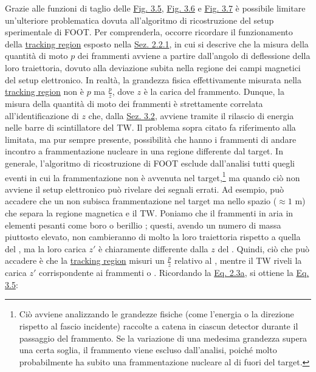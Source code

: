 \documentclass[12pt,a4paper,twoside]{report}
\begin{document}
	Grazie alle funzioni di taglio delle \hyperref[fig:a1_cut]{Fig. 3.5}, \hyperref[fig:a2_cut]{Fig. 3.6} e \hyperref[fig:a3_cut]{Fig. 3.7} è possibile limitare un'ulteriore problematica dovuta all'algoritmo di ricostruzione del setup sperimentale di FOOT. Per comprenderla, occorre ricordare il funzionamento della \hyperref[par:tracking_region]{tracking region} esposto nella \hyperref[sec:setupElettronico]{Sez. 2.2.1}, in cui si descrive che la misura della quantità di moto $p$ dei frammenti avviene a partire dall'angolo di deflessione della loro traiettoria, dovuto alla deviazione subita nella regione dei campi magnetici del setup elettronico. In realtà, la grandezza fisica effettivamente misurata nella \hyperref[par:tracking_region]{tracking region} non è $p$ ma $\frac{p}{z}$, dove $z$ è la carica del frammento. Dunque, la misura della quantità di moto dei frammenti è strettamente correlata all'identificazione di $z$ che, dalla \hyperref[sec:atomic_number_identification]{Sez. 3.2}, avviene tramite il rilascio di energia nelle barre di scintillatore del TW. Il problema sopra citato fa riferimento alla limitata, ma pur sempre presente, possibilità che hanno i frammenti di andare incontro a frammentazione nucleare in una regione differente dal target. In generale, l'algoritmo di ricostruzione di FOOT esclude dall'analisi tutti quegli eventi in cui la frammentazione non è avvenuta nel target,\footnote{Ciò avviene analizzando le grandezze fisiche (come l'energia o la direzione rispetto al fascio incidente) raccolte a catena in ciascun detector durante il passaggio del frammento. Se la variazione di una medesima grandezza supera una certa soglia, il frammento viene escluso dall'analisi, poiché molto probabilmente ha subito una frammentazione nucleare al di fuori del target.} ma quando ciò non avviene il setup elettronico può rivelare dei segnali errati. Ad esempio, può accadere che un  non subisca frammentazione nel target ma nello spazio ($\approx1\mbox{ m}$) che separa la regione magnetica e il TW. Poniamo che il  frammenti in aria in elementi pesanti come boro  o berillio ; questi, avendo un numero di massa piuttosto elevato, non cambieranno di molto la loro traiettoria rispetto a quella del , ma la loro carica $z'$ è chiaramente differente dalla $z$ del . Quindi, ciò che può accadere è che la \hyperref[par:tracking_region]{tracking region} misuri un $\frac{p}{z}$ relativo al , mentre il TW riveli la carica $z'$ corrispondente ai frammenti  o . Ricordando la \hyperref[eq:a1]{Eq. 2.3a}, si ottiene la \hyperref[eq:error_reconstruction]{Eq. 3.5}:
\end{document}
